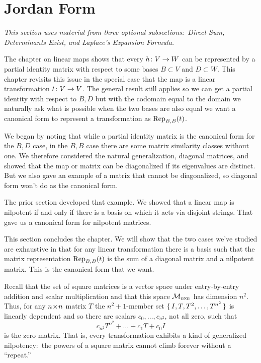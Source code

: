 \section{Jordan Form}
\noindent\textit{This section uses material from three optional
subsections:~Direct Sum, Determinants Exist, and
Laplace's Expansion Formula.}

The chapter on linear maps shows that every $\map{h}{V}{W}$ can
be represented by a partial identity matrix with respect to some
bases $B\subset V$ and $D\subset W$. 
This chapter revisits this issue in the special case that the map is a
linear transformation $\map{t}{V}{V}$.
The general result still applies so we can get a partial identity
with respect to $B,D$ but
with the codomain equal to the domain
we naturally ask what is possible when the two bases are also equal\Dash
we want a canonical form to represent a transformation
as $\rep{t}{B,B}$.

We began 
by noting that while a partial identity matrix is the canonical form
for the $B,D$ case, in the $B,B$ case there are some matrix similarity
classes without one.
We therefore considered the natural generalization, diagonal matrices, and
showed that the map or matrix can be diagonalized
if its eigenvalues are distinct.
But we also gave an example of a matrix that cannot be diagonalized,
so diagonal form won't do as the canonical form. 

The prior section developed that example.
We showed that 
a linear map is nilpotent if and only 
if there is a basis on which it acts via disjoint strings.
That gave us a canonical form for nilpotent matrices.

This section concludes the chapter.
We will show that the two cases we've studied are exhaustive 
in that for any linear transformation there is
a basis such that the matrix representation $\rep{t}{B,B}$ is the sum of a 
diagonal matrix and a nilpotent matrix.
This is the canonical form that we want.









Recall that the set of square matrices
is a vector space under entry-by-entry addition and scalar multiplication and
that 
this space 
\( \matspace_{\nbyn{n}} \) has dimension \( n^2 \).
Thus, for any \( \nbyn{n} \) matrix $T$ the
\( n^2+1 \)-member set \( \set{I,T,T^2,\dots,T^{n^2} } \) is linearly
dependent and so there are scalars \( c_0,\dots,c_{n^2} \),
not all zero, such that
\begin{equation*}
  c_{n^2}T^{n^2}+\dots+c_1T+c_0I
\end{equation*}
is the zero matrix.
That is, every transformation exhibits a kind of
generalized nilpotency:~the powers
of a square matrix cannot climb forever without a ``repeat.''

